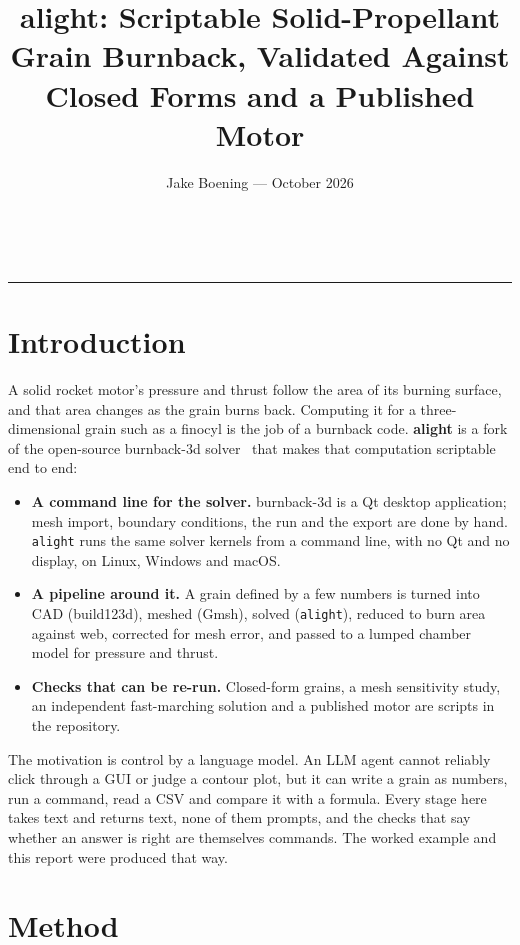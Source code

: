 \documentclass[10pt,a4paper]{article}
\title{alight: Scriptable Solid-Propellant Grain Burnback, Validated Against Closed Forms and a Published Motor}
\author{Jake Boening --- October 2026}
\makeatletter
\renewcommand{\maketitle}{%
  \noindent
  \begin{minipage}{\textwidth}
    \centering
    {\large\bfseries \@title}\\[2pt]
    {\normalsize \@author}
  \end{minipage}
  \vspace{3pt}
  \hrule
  \vspace{6pt}
}
\makeatother
\begin{document}
\maketitle

\section{Introduction}

A solid rocket motor's pressure and thrust follow the area of its burning surface, and that area
changes as the grain burns back. Computing it for a three-dimensional grain such as a finocyl is
the job of a burnback code. \textbf{alight} is a fork of the open-source burnback-3d
solver~\cite{burnback3d} that makes that computation scriptable end to end:

\begin{itemize}[leftmargin=1.4em,itemsep=0pt,topsep=1pt]
\item \textbf{A command line for the solver.} burnback-3d is a Qt desktop application; mesh import,
  boundary conditions, the run and the export are done by hand. \texttt{alight} runs the same solver
  kernels from a command line, with no Qt and no display, on Linux, Windows and macOS.
\item \textbf{A pipeline around it.} A grain defined by a few numbers is turned into CAD
  (build123d), meshed (Gmsh), solved (\texttt{alight}), reduced to burn area against web, corrected
  for mesh error, and passed to a lumped chamber model for pressure and thrust.
\item \textbf{Checks that can be re-run.} Closed-form grains, a mesh sensitivity study, an
  independent fast-marching solution and a published motor are scripts in the repository.
\end{itemize}

The motivation is control by a language model. An LLM agent cannot reliably click through a GUI or
judge a contour plot, but it can write a grain as numbers, run a command, read a CSV and compare it
with a formula. Every stage here takes text and returns text, none of them prompts, and the checks
that say whether an answer is right are themselves commands. The worked example and this report
were produced that way.

\section{Method}
\end{document}
